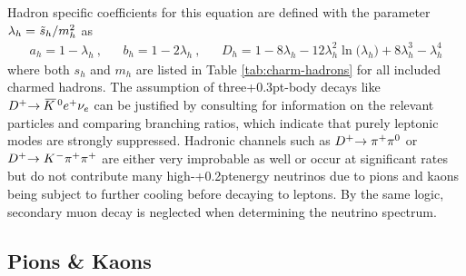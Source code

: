 Hadron specific coefficients for this equation are defined with the parameter
$\lambda_h = \kern+0.5pt \tilde{s}_h / m_h^2 \kern+0.2pt$ as
\begin{align*}
	a_h = 1 - \lambda_h \: , && b_h = 1 - 2\lambda_h \: , &&
	D_h = 1 - 8 \lambda_h - 12\lambda_h^2 \ln \bigl( \lambda_h \bigr) + 8 \lambda_h^3 - \lambda_h^4
\end{align*}
where both $s_h$ and $m_h$ are listed in Table \ref{tab:charm-hadrons} for all included charmed hadrons. The assumption of
three{\kern+0.3pt}-body decays like $D^+ \kern-2.5pt \rightarrow \kern+1.0pt \overline{\kern-1.5pt K \kern+1.0pt}\kern+1.0pt^0 e^+ \nu_e$
can be justified by consulting \cite{pdg} for information on the relevant particles and comparing branching ratios, which indicate
that purely leptonic modes are strongly suppressed. Hadronic channels such as $D^+ \kern-2.5pt \rightarrow \pi^+ \pi^0$ or
$D^+ \kern-2.5pt \rightarrow K^{\kern+0.5pt -} \pi^+ \pi^+$ are either very improbable as well or occur at significant rates but
do not contribute many high-{\kern+0.2pt}energy neutrinos due to pions and kaons being subject to further cooling before decaying
to leptons. By the same logic, secondary muon decay is neglected when determining the neutrino spectrum.

\newpage





\subsection{Pions \& Kaons}
\label{sub:pions}

